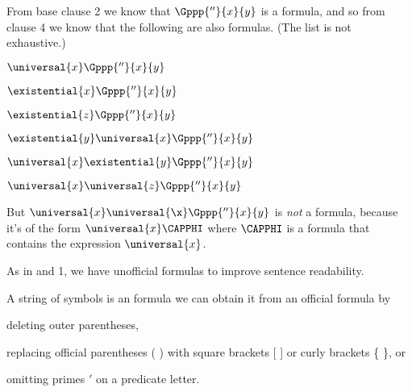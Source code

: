 From base clause 2 we know that $\Gppp{''}{\variable{x}}{\variable{y}}$ is a formula, and so from clause 4 we know that the following are also formulas. 
(The list is not exhaustive.) 
\begin{multicols}{2}
\begin{menumerate}
\item $\universal{\variable{x}}\Gppp{''}{\variable{x}}{\variable{y}}$ 
\item $\existential{\variable{x}}\Gppp{''}{\variable{x}}{\variable{y}}$ 
\item $\existential{\variable{z}}\Gppp{''}{\variable{x}}{\variable{y}}$
\item $\existential{\variable{y}}\universal{\variable{x}}\Gppp{''}{\variable{x}}{\variable{y}}$ 
\item $\universal{\variable{x}}\existential{\variable{y}}\Gppp{''}{\variable{x}}{\variable{y}}$ 
\item $\universal{\variable{x}}\universal{\variable{z}}\Gppp{''}{\variable{x}}{\variable{y}}$ 
\end{menumerate}
\end{multicols}
\noindent{}But $\universal{\variable{x}}\universal{\x}\Gppp{''}{\variable{x}}{\variable{y}}$ is \emph{not} a formula, because it's of the form $\universal{\variable{x}}\CAPPHI$ where $\CAPPHI$ is a formula that contains the expression $\universal{\variable{x}}$.

As in \GSL{} and \GQL{}1, we have unofficial formulas to improve sentence readability.
\begin{majorILnc}{}
A string of symbols is an  formula \Iff we can obtain it from an official formula by
\begin{cenumerate}
\item deleting outer parentheses,
\item replacing official parentheses ( ) with square brackets [ ] or curly brackets \{ \}, or
\item omitting primes $'$ on a predicate letter.
\end{cenumerate}
\end{majorILnc}

